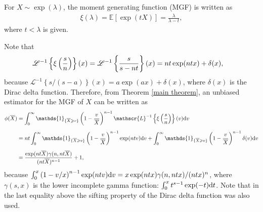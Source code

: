 \documentclass[12pt]{article}
\theoremstyle{definition}
\begin{document}
For  $X\sim\exp(\lambda)$, the moment generating function (MGF) is written as
\begin{align*}
	\xi(\lambda)=\mathbb{E}[\exp(tX)]
	=
	{\frac{\lambda}{\lambda -t}},
\end{align*}
where $t<\lambda$ is given. 

Note that
\begin{align*}
	\mathscr{L}^{-1}\left\{	
	{\displaystyle \xi\left({s\over n}\right)}
	\right\}
	(x)
	&=
	\mathscr{L}^{-1}\left\{
	{\frac{s}{s -nt}}
	\right\}
	(x)
	=
	nt\exp(ntx)+\delta(x),
\end{align*}
because $\mathscr{L}^{-1}\left\{s/(s-a)\right\}(x)=a\exp(ax)+\delta(x)$,  where $\delta(x)$ is the Dirac delta function. Therefore, from Theorem \ref{main theorem}, an unbiased estimator for the MGF of $X$ can be written as
\begin{align*}
	\phi(\overline{X})
	&=
	\int_0^{\infty} 
	\mathds{1}_{\{\overline{X}\geqslant v\}}
	\left(1-{v\over \overline{X}}\right)^{n-1} 
	\mathscr{L}^{-1}\left\{\xi\left({s\over n}\right)
	\right\}(v){\rm d}v
	\\[0,2cm]
	&=
	nt
	\int_0^{\infty} 
	\mathds{1}_{\{\overline{X}\geqslant v\}}
	\left(1-{v\over \overline{X}}\right)^{n-1} 
	\exp(ntv)
	{\rm d}v
	+
	\int_0^{\infty} 
	\mathds{1}_{\{\overline{X}\geqslant v\}}
	\left(1-{v\over \overline{X}}\right)^{n-1} 
	\delta(v)
	{\rm d}v
	\\[0,2cm]
	&=
	{\exp(nt\overline{X}) \gamma(n,nt\overline{X})\over (nt\overline{X})^{n-1}}
	+
	1,
\end{align*}
because $    \int_0^{x} 
\left(1-{v/x}\right)^{n-1} 
\exp(ntv)
{\rm d}v
=
x\exp(ntx) \gamma(n,ntx)/(ntx)^n
$, where $\gamma (s,x)$ is the lower incomplete gamma function: ${\int _{0}^{x}t^{s-1}\exp({-t}){\rm d}t}$.
Note that in the last equality above the sifting property of the Dirac delta function was also used.


















\smallskip 
\end{document}
